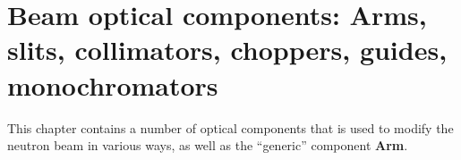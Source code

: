 
\chapter{Beam optical components:
Arms, slits, collimators, choppers, guides, monochromators}
This chapter contains a number of optical components 
that is used to modify the neutron beam in various ways,
as well as the ``generic'' component {\bf Arm}.



\newpage


\newpage


\newpage


%

\newpage


\newpage


%

\newpage


\newpage

